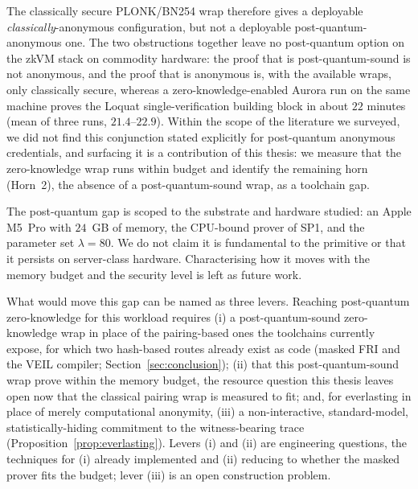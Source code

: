 The classically secure PLONK/BN254 wrap therefore gives a deployable \emph{classically}-anonymous configuration, but not a deployable post-quantum-anonymous one. The two obstructions together leave no post-quantum option on the zkVM stack on commodity hardware: the proof that is post-quantum-sound is not anonymous, and the proof that is anonymous is, with the available wraps, only classically secure, whereas a zero-knowledge-enabled Aurora run on the same machine proves the Loquat single-verification building block in about $22$ minutes (mean of three runs, $21.4$--$22.9$). Within the scope of the literature we surveyed, we did not find this conjunction stated explicitly for post-quantum anonymous credentials, and surfacing it is a contribution of this thesis: we measure that the zero-knowledge wrap runs within budget and identify the remaining horn (Horn~2), the absence of a post-quantum-sound wrap, as a toolchain gap.

The post-quantum gap is scoped to the substrate and hardware studied: an Apple M5~Pro with $24$~GB of memory, the CPU-bound prover of SP1, and the parameter set $\lambda=80$. We do not claim it is fundamental to the primitive or that it persists on server-class hardware. Characterising how it moves with the memory budget and the security level is left as future work.

What would move this gap can be named as three levers. Reaching post-quantum zero-knowledge for this workload requires (i) a post-quantum-sound zero-knowledge wrap in place of the pairing-based ones the toolchains currently expose, for which two hash-based routes already exist as code (masked {FRI} and the {VEIL} compiler; Section~\ref{sec:conclusion}); (ii) that this post-quantum-sound wrap prove within the memory budget, the resource question this thesis leaves open now that the classical pairing wrap is measured to fit; and, for everlasting in place of merely computational anonymity, (iii) a non-interactive, standard-model, statistically-hiding commitment to the witness-bearing trace (Proposition~\ref{prop:everlasting}). Levers (i) and (ii) are engineering questions, the techniques for (i) already implemented and (ii) reducing to whether the masked prover fits the budget; lever (iii) is an open construction problem.

